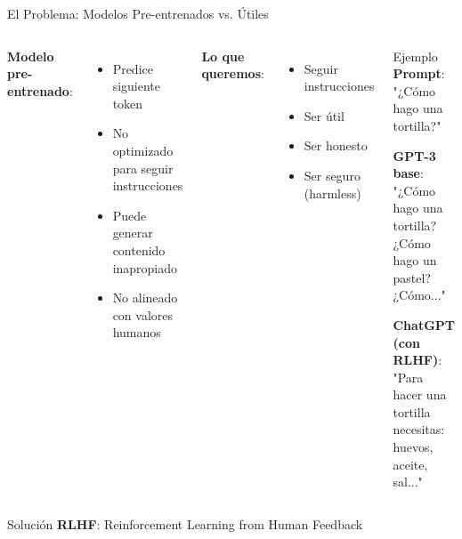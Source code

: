 \begin{frame}{El Problema: Modelos Pre-entrenados vs. Útiles}

\begin{columns}
\textbf{Modelo pre-entrenado}:
\begin{itemize}
    \item Predice siguiente token
    \item No optimizado para seguir instrucciones
    \item Puede generar contenido inapropiado
    \item No alineado con valores humanos
\end{itemize}

\vspace{0.5em}

\textbf{Lo que queremos}:
\begin{itemize}
    \item Seguir instrucciones
    \item Ser útil
    \item Ser honesto
    \item Ser seguro (harmless)
\end{itemize}

\begin{exampleblock}{Ejemplo}
\small
\textbf{Prompt}: "¿Cómo hago una tortilla?"

\vspace{0.3em}
\textbf{GPT-3 base}:
"¿Cómo hago una tortilla? ¿Cómo hago un pastel? ¿Cómo..."

\vspace{0.3em}
\textbf{ChatGPT (con RLHF)}:
"Para hacer una tortilla necesitas: huevos, aceite, sal..."
\end{exampleblock}

\end{columns}

\vspace{1em}

\begin{alertblock}{Solución}
\textbf{RLHF}: Reinforcement Learning from Human Feedback
\end{alertblock}

\end{frame}

